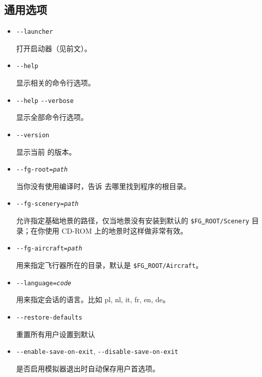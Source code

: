 \ifchinese
{
\subsection{通用选项}\label{generaloptions}
\begin{itemize}
\item{\texttt{-$ $-launcher}}

  打开启动器（见前文）。
  
\item{\texttt{-$ $-help}}

  显示相关的命令行选项。

\item{\texttt{-$ $-help} \texttt{-$ $-verbose}}

  显示全部命令行选项。

\item{\texttt{-$ $-version} }

  显示当前 \FlightGear{} 的版本。

\item{\texttt{-$ $-fg-root={\it path}}}

  当你没有使用编译时，告诉 \FlightGear{} 去哪里找到程序的根目录。

\item{\texttt{-$ $-fg-scenery={\it path}}}

  允许指定基础地景的路径，仅当地景没有安装到默认的 \texttt{\$FG\underline{~}ROOT/Scenery} 目录；在你使用 CD-ROM 上的地景时这样做非常有效。

\item{\texttt{-$ $-fg-aircraft={\it path}}}

  用来指定飞行器所在的目录，默认是 \texttt{\$FG\underline{~}ROOT/Aircraft}。

\item{\texttt{-$ $-language={\it code}}}

  用来指定会话的语言。比如 pl, nl, it, fr, en, de。

\item{\texttt{-$ $-restore-defaults}}

  重置所有用户设置到默认

\item{\texttt{-$ $-enable-save-on-exit}, \texttt{-$ $-disable-save-on-exit}}

  是否启用模拟器退出时自动保存用户首选项。


\end{itemize}}
